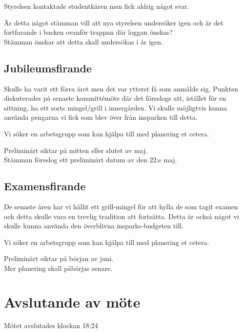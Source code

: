 \documentclass[protokoll]{dvd}
\begin{document}
Styrelsen kontaktade studentkåren men fick aldrig något svar. 

Är detta något stämman vill att nya styrelsen undersöker igen och är det fortfarande i backen ovanför trappan där loggan önskas?
\\

Stämman önskar att detta skall undersökas i år igen. 

\subsection*{Jubileumsfirande}
Skulle ha varit ett förra året men det var ytterst få som anmälde sig. 
Punkten diskuterades på senaste kommittémöte där det föreslogs att, istället för en sittning, ha ett sorts mingel/grill i innergården. 
Vi skulle möjligtvis kunna använda pengarna vi fick som blev över från insparken till detta. 

Vi söker en arbetsgrupp som kan hjälpa till med planering et cetera. 

Preliminärt siktar på mitten eller slutet av maj.
\\ 

Stämman föreslog ett preliminärt datum av den 22:e maj.


\subsection*{Examensfirande}
De senaste åren har vi hållit ett grill-mingel för att hylla de som tagit examen och detta skulle vara en trevlig tradition att fortsätta.  
Detta är också något vi skulle kunna använda den överblivna insparks-budgeten till. 

Vi söker en arbetsgrupp som kan hjälpa till med planering et cetera. 

Preliminärt siktar på början av juni.
\\

Mer planering skall påbörjas senare. 


\section{Avslutande av möte}

Mötet avslutades klockan 18:24

\end{document}
